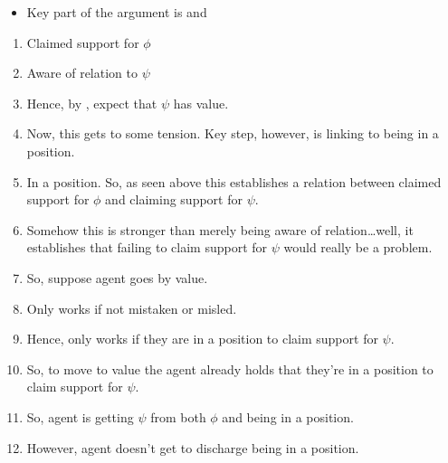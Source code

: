 \begin{note}[Outline]
  \begin{itemize}
  \item Key part of the argument is \RBV{} and \eiS{}
  \end{itemize}

  \begin{enumerate}
  \item Claimed support for \(\phi\)
  \item Aware of relation to \(\psi\)
  \item Hence, by \eiS{}, expect that \(\psi\) has value.
  \item Now, this gets to some tension.
    Key step, however, is linking to being in a position.
  \item In a position.
    So, as seen above this establishes a relation between claimed support for \(\phi\) and claiming support for \(\psi\).
  \item Somehow this is stronger than merely being aware of relation\dots well, it establishes that failing to claim support for \(\psi\) would really be a problem.
  \item So, suppose agent goes by value.
  \item Only works if not mistaken or misled.
  \item Hence, only works if they are in a position to claim support for \(\psi\).
  \item So, to move to value the agent already holds that they're in a position to claim support for \(\psi\).
  \item So, agent is getting \(\psi\) from both \(\phi\) and being in a position.
  \item However, agent doesn't get to discharge being in a position.
  \end{enumerate}
\end{note}


